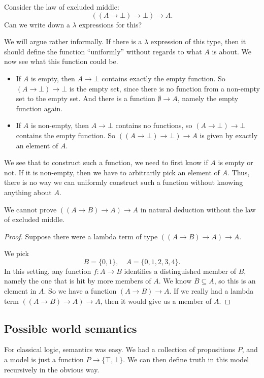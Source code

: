 \documentclass[a4paper]{article}
\begin{document}
\begin{eg}
  Consider the law of excluded middle:
  \[
    ((A \to \bot) \to \bot) \to A.
  \]
  Can we write down a $\lambda$ expressions for this?

  We will argue rather informally. If there is a $\lambda$ expression of this type, then it should define the function ``uniformly'' without regards to what $A$ is about. We now see what this function could be.
  \begin{itemize}
    \item If $A$ is empty, then $A \to \bot$ contains exactly the empty function. So $(A\to \bot) \to \bot$ is the empty set, since there is no function from a non-empty set to the empty set. And there is a function $\emptyset \to A$, namely the empty function again.
    \item If $A$ is non-empty, then $A \to \bot$ contains no functions, so $(A \to \bot) \to \bot$ contains the empty function. So $((A \to \bot) \to \bot) \to A$ is given by exactly an element of $A$.
  \end{itemize}
  We see that to construct such a function, we need to first know if $A$ is empty or not. If it is non-empty, then we have to arbitrarily pick an element of $A$. Thus, there is no way we can uniformly construct such a function without knowing anything about $A$.
\end{eg}

\begin{prop}
  We cannot prove $((A \to B) \to A) \to A$ in natural deduction without the law of excluded middle.
\end{prop}

\begin{proof}
  Suppose there were a lambda term of type $((A \to B) \to A) \to A$.

  We pick
  \[
    B = \{0, 1\}, \quad A = \{0, 1, 2, 3, 4\}.
  \]
  In this setting, any function $f: A \to B$ identifies a distinguished member of $B$, namely the one that is hit by more members of $A$. We know $B \subseteq A$, so this is an element in $A$. So we have a function $(A \to B) \to A$. If we really had a lambda term $((A \to B) \to A) \to A$, then it would give us a member of $A$.

\end{proof}

\subsection{Possible world semantics}
For classical logic, semantics was easy. We had a collection of propositions $P$, and a model is just a function $P \to \{\top, \bot\}$. We can then define truth in this model recursively in the obvious way.
\end{document}
